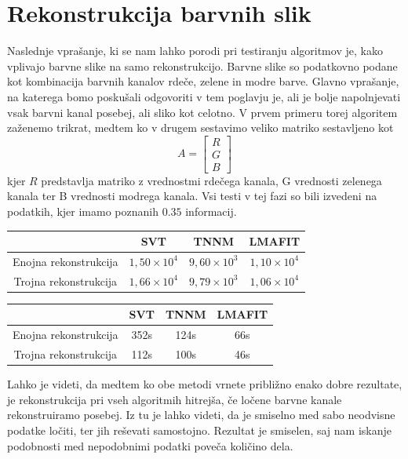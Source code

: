 \section{Rekonstrukcija barvnih slik}
Naslednje vprašanje, ki se nam lahko porodi pri testiranju algoritmov je, kako vplivajo barvne slike na samo rekonstrukcijo. Barvne slike so podatkovno podane kot kombinacija barvnih kanalov rdeče, zelene in modre barve. Glavno vprašanje, na katerega bomo poskušali odgovoriti v tem poglavju je, ali je bolje napolnjevati vsak barvni kanal posebej, ali sliko kot celotno. V prvem primeru torej algoritem zaženemo trikrat, medtem ko v drugem sestavimo veliko matriko sestavljeno kot 
\[
    A = \begin{bmatrix}
        R\\G\\B
    \end{bmatrix} 
\] 
kjer $R$ predstavlja matriko z vrednostmi rdečega kanala, G vrednosti zelenega kanala ter B vrednosti modrega kanala.
Vsi testi v tej fazi so bili izvedeni na podatkih, kjer imamo poznanih $0.35$ informacij.
\begin{table}[h]
    \centering
    \begin{tabular}{|c|c|c|c|}
    \hline
    & SVT & TNNM & LMAFIT \\
    \hline
    Enojna rekonstrukcija & $1,50 \times 10^4$ & $9,60\times 10^3$ & $1,10 \times 10^4$ \\
    Trojna rekonstrukcija & $1,66\times 10^4$ & $9,79\times 10^3$ & $1,06 \times 10^4$ \\
    \hline
    \end{tabular}
\end{table}

\begin{table}[h]
    \centering
    \begin{tabular}{|c|c|c|c|}
    \hline
    & SVT & TNNM & LMAFIT \\
    \hline
    Enojna rekonstrukcija & 352s & 124s & 66s \\
    Trojna rekonstrukcija & 112s & 100s & 46s \\
    \hline
    \end{tabular}
\end{table}
Lahko je videti, da medtem ko obe metodi vrnete približno enako dobre rezultate, je rekonstrukcija pri vseh algoritmih hitrejša, če ločene barvne kanale rekonstruiramo posebej. Iz tu je lahko videti, da je smiselno med sabo neodvisne podatke ločiti, ter jih reševati samostojno. Rezultat je smiselen, saj nam iskanje podobnosti med nepodobnimi podatki poveča količino dela. 

